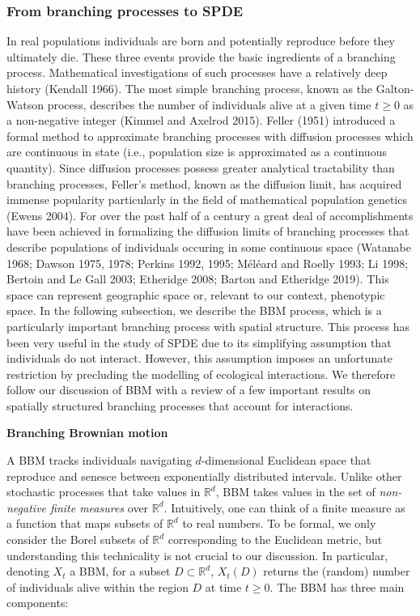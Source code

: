\documentclass[]{article}
\begin{document}
\hypertarget{from-branching-processes-to-spde}{%
\subsubsection{\texorpdfstring{From branching processes to SPDE
\label{stochastic}}{From branching processes to SPDE }}\label{from-branching-processes-to-spde}}

In real populations individuals are born and potentially reproduce
before they ultimately die. These three events provide the basic
ingredients of a branching process. Mathematical investigations of such
processes have a relatively deep history (Kendall 1966). The most simple
branching process, known as the Galton-Watson process, describes the
number of individuals alive at a given time \(t\geq0\) as a non-negative
integer (Kimmel and Axelrod 2015). Feller (1951) introduced a formal
method to approximate branching processes with diffusion processes which
are continuous in state (i.e., population size is approximated as a
continuous quantity). Since diffusion processes possess greater
analytical tractability than branching processes, Feller's method, known
as the diffusion limit, has acquired immense popularity particularly in
the field of mathematical population genetics (Ewens 2004). For over the
past half of a century a great deal of accomplishments have been
achieved in formalizing the diffusion limits of branching processes that
describe populations of individuals occuring in some continuous space
(Watanabe 1968; Dawson 1975, 1978; Perkins 1992, 1995; Méléard and
Roelly 1993; Li 1998; Bertoin and Le Gall 2003; Etheridge 2008; Barton
and Etheridge 2019). This space can represent geographic space or,
relevant to our context, phenotypic space. In the following subsection,
we describe the BBM process, which is a particularly important branching
process with spatial structure. This process has been very useful in the
study of SPDE due to its simplifying assumption that individuals do not
interact. However, this assumption imposes an unfortunate restriction by
precluding the modelling of ecological interactions. We therefore follow
our discussion of BBM with a review of a few important results on
spatially structured branching processes that account for interactions.

\textbf{Branching Brownian motion}

A BBM tracks individuals navigating \(d\)-dimensional Euclidean space
that reproduce and senesce between exponentially distributed intervals.
Unlike other stochastic processes that take values in \(\mathbb{R}^d\),
BBM takes values in the set of \emph{non-negative finite measures} over
\(\mathbb{R}^d\). Intuitively, one can think of a finite measure as a
function that maps subsets of \(\mathbb{R}^d\) to real numbers. To be
formal, we only consider the Borel subsets of \(\mathbb{R}^d\)
corresponding to the Euclidean metric, but understanding this
technicality is not crucial to our discussion. In particular, denoting
\(X_t\) a BBM, for a subset \(D\subset\mathbb{R}^d\), \(X_t(D)\) returns
the (random) number of individuals alive within the region \(D\) at time
\(t\geq0\). The BBM has three main components:
\end{document}
